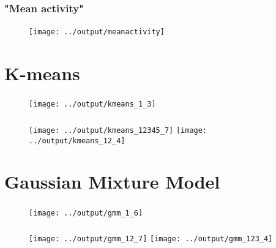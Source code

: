 \documentclass[12pt, english]{beamer}
\begin{document}
\begin{frame}
  \frametitle{"Mean activity"}
  \framesubtitle{}
  
\begin{figure}
\centering
\texttt{[image: ../output/meanactivity]}
    \caption*{}
    \label{fig:mean}  
\end{figure}

\end{frame}

\section{K-means}
\begin{frame}
  \frametitle{}
  \framesubtitle{}

\begin{figure}
\centering
\texttt{[image: ../output/kmeans\_1\_3]}
    \caption*{}
    \label{fig:kmeams}  
\end{figure}
\end{frame}

\begin{frame}
  \frametitle{}
  \framesubtitle{}

\begin{figure}
\centering
\texttt{[image: ../output/kmeans\_12345\_7]}
\texttt{[image: ../output/kmeans\_12\_4]}
    \caption*{}
    \label{fig:kmeams2}  
\end{figure}
\end{frame}

\section{Gaussian Mixture Model}
\begin{frame}
  \frametitle{}
  \framesubtitle{}

\begin{figure}
\centering
\texttt{[image: ../output/gmm\_1\_6]}
    \caption*{}
    \label{fig:gmm}  
\end{figure}
\end{frame}

\begin{frame}
  \frametitle{}
  \framesubtitle{}

\begin{figure}
\centering
\texttt{[image: ../output/gmm\_12\_7]}
\texttt{[image: ../output/gmm\_123\_4]}
    \caption*{}
    \label{fig:gmm2}  
\end{figure}
\end{frame}
\end{document}

